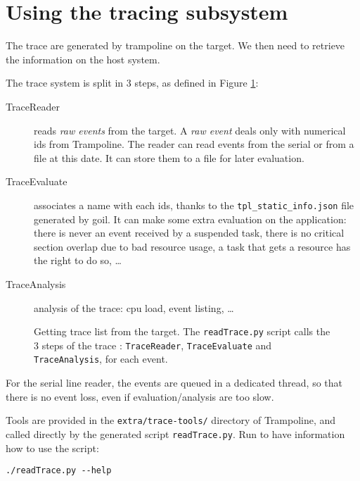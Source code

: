 \section{Using the tracing subsystem}

The trace are generated by trampoline on the target. We then need to retrieve the information on the host system. 

The trace system is split in 3 steps, as defined in Figure \ref{fig:trace}:
\begin{description}
	\item[TraceReader] reads \textsl{raw events} from the target. A \textsl{raw event} deals only with numerical ids from Trampoline. The reader can read events from the serial or from a file at this date. It can store them to a file for later evaluation.
	\item[TraceEvaluate] associates a name with each ids, thanks to the \lstinline{tpl_static_info.json} file generated by goil. It can make some extra evaluation on the application: there is never an event received by a suspended task, there is no critical section overlap due to bad resource usage, a task that gets a resource has the right to do so, …
	\item[TraceAnalysis] analysis of the trace: cpu load, event listing, …
\end{description}

\begin{figure}[htbp]
    \centering
	\begin{adjustbox}{width=.7\linewidth,keepaspectratio}
		
	\end{adjustbox}
	\caption{Getting trace list from the target. The \lstinline{readTrace.py} script calls the 3 steps of the trace : \lstinline{TraceReader}, \lstinline{TraceEvaluate} and \lstinline{TraceAnalysis}, for each event.}
	\label{fig:trace}
\end{figure}

For the serial line reader, the events are queued in a dedicated thread, so that there is no event loss, even if evaluation/analysis are too slow.


Tools are provided in the \texttt{extra/trace-tools/} directory of Trampoline, and called directly by the generated script \lstinline{readTrace.py}. Run to have information how to use the script:

\begin{lstlisting}
./readTrace.py --help
\end{lstlisting}

